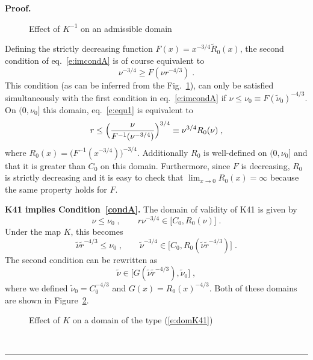 \documentclass[11pt]{preprint}
\newenvironment{proof}[1][Proof]{\textbf{#1.} }{\ \rule{0.5em}{0.5em}}
\begin{document}
\begin{proof}
\begin{figure}
\begin{center}
\end{center}
\caption{Effect of $K^{-1}$ on an admissible domain}
\label{fig:effectK}
\end{figure}


Defining the strictly decreasing function $F(x)=x^{-3/4}\tilde{R}_{0}(x)$, the
second condition of eq.~\ref{e:imcondA} is of course  equivalent to
\begin{equation}
\nu^{-3/4}\geq F(\nu r^{-4/3})\;.\label{e:equ1}%
\end{equation}
This condition (as can be inferred from the Fig.~\ref{fig:effectK}), can only be
satisfied simultaneously with the first condition in eq.~\ref{e:imcondA} if
$\nu\leq\nu_{0}\equiv F(\tilde{\nu}_{0})^{-4/3}$. On $(0,\nu_{0}]$ this
domain, eq.~\ref{e:equ1} is equivalent to
\begin{equation}
r\leq\Bigl({\frac{\nu}{{F^{-1}(\nu^{-3/4})}}}\Bigr)^{3/4}\equiv\nu^{3/4}%
R_{0}(\nu)\;,
\end{equation}
where $R_{0}(x)=\bigl(F^{-1}(x^{-3/4})\bigr)^{-3/4}$. Additionally $R_{0}$ is
well-defined on $(0,\nu_{0}]$ and that it is greater than $C_{0}$ on this
domain. Furthermore, since $F$ is decreasing, $R_{0}$ is strictly decreasing
and it is easy to check that $\lim_{x\rightarrow0}R_{0}(x)=\infty$ because the
same property holds for $F$.

\medskip
\noindent\textbf{K41 implies Condition~\ref{condA}.} The domain of validity of K41 is
given by
\begin{equation}\label{e:domK41}
\nu\leq\nu_{0}\;,\qquad r\nu^{-3/4}\in\lbrack C_{0},R_{0}(\nu)]\;.
\end{equation}
Under the map $K$, this becomes
\begin{equation}
\tilde{\nu}\tilde{r}^{-4/3}\leq\nu_{0}\;,\qquad\tilde{\nu}^{-3/4}\in\lbrack
C_{0},R_{0}(\tilde{\nu}\tilde{r}^{-4/3})]\;.\label{e:imcondK41}%
\end{equation}
The second condition can be rewritten as
\begin{equation}
\tilde{\nu}\in\lbrack G(\tilde{\nu}\tilde{r}^{-4/3}),\tilde{\nu}_{0}]\;,
\end{equation}
where we defined $\tilde{\nu}_{0}=C_{0}^{-4/3}$ and $G(x)=R_{0}(x)^{-4/3}$.
Both of these domains are shown in Figure~\ref{fig:effectKinv}.


\begin{figure}
\begin{center}
\end{center}
\caption{Effect of $K$ on a domain of the type (\ref{e:domK41})}
\label{fig:effectKinv}
\end{figure}


\end{proof}
\end{document}
